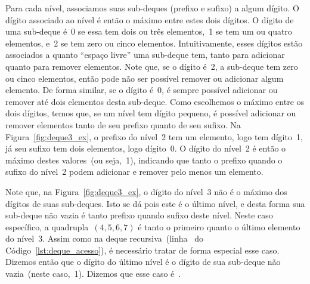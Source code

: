 \documentclass[main.tex]{subfiles}
\begin{document}
Para cada nível, associamos suas sub-deques (prefixo e sufixo) a algum dígito. O dígito associado ao nível é então o máximo entre estes dois dígitos. O dígito de uma sub-deque é~0 se essa tem dois ou três elementos,~1 se tem um ou quatro elementos, e~2 se tem zero ou cinco elementos. Intuitivamente, esses dígitos estão associados a quanto ``espaço livre'' uma sub-deque tem, tanto para adicionar quanto para remover elementos. Note que, se o dígito é~2, a sub-deque tem zero ou cinco elementos, então pode não ser possível remover ou adicionar algum elemento. De forma similar, se o dígito é~0, é sempre possível adicionar ou remover até dois elementos desta sub-deque. Como escolhemos o máximo entre os dois dígitos, temos que, se um nível tem dígito pequeno, é possível adicionar ou remover elementos tanto de seu prefixo quanto de seu sufixo. Na Figura~\ref{fig:deque3_ex}, o prefixo do nível~2 tem um elemento, logo tem dígito~1, já seu sufixo tem dois elementos, logo dígito~0. O dígito do nível~2 é então o máximo destes valores~(ou seja,~1), indicando que tanto o prefixo quando o sufixo do nível~2 podem adicionar e remover pelo menos um elemento.

Note que, na Figura~\ref{fig:deque3_ex}, o dígito do nível~3 não é o máximo dos dígitos de suas sub-deques. Isto se dá pois este é o último nível, e desta forma sua sub-deque não vazia é tanto prefixo quando sufixo deste nível. Neste caso específico, a quadrupla~$(4, 5, 6, 7)$ é tanto o primeiro quanto o último elemento do nível~3. Assim como na deque recursiva~(linha~ do Código~\ref{lst:deque_acesso}), é necessário tratar de forma especial esse caso. Dizemos então que o dígito do último nível é o dígito de sua sub-deque não vazia~(neste caso,~1). Dizemos que esse caso é~.


\end{document}
